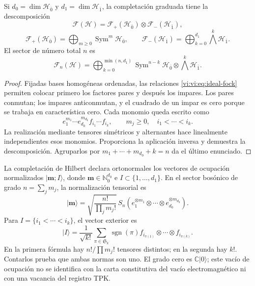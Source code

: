\begin{theorem}
\label{vi:vi:thm:fock-graduado}
Si \(d_0=\dim\mathcal H_{\bar0}\) y
\(d_1=\dim\mathcal H_{\bar1}\), la completación graduada tiene
la descomposición
\begin{equation}
 \mathcal F(\mathcal H)=
 \mathcal F_+(\mathcal H_{\bar0})\otimes
 \mathcal F_-(\mathcal H_{\bar1}),
 \label{vi:vi:eq:fock-producto}
\end{equation}
\[
 \mathcal F_+(\mathcal H_{\bar0})=
 \bigoplus_{m\ge0}\operatorname{Sym}^m\mathcal H_{\bar0},
 \qquad
 \mathcal F_-(\mathcal H_{\bar1})=
 \bigoplus_{k=0}^{d_1}\bigwedge^k\mathcal H_{\bar1}.
\]
El sector de número total \(n\) es
\[
 \mathcal F_n(\mathcal H)=
 \bigoplus_{k=0}^{\min(n,d_1)}
 \operatorname{Sym}^{n-k}\mathcal H_{\bar0}
 \otimes\bigwedge^k\mathcal H_{\bar1}.
\]
\end{theorem}
\begin{proof}
Fijadas bases homogéneas ordenadas, las relaciones
\eqref{vi:vi:eq:ideal-fock} permiten colocar primero los factores pares
y después los impares. Los pares conmutan; los impares anticonmutan,
y el cuadrado de un impar es cero porque se trabaja en característica
cero. Cada monomio queda escrito como
\[
 e_1^{m_1}\cdots e_{d_0}^{m_{d_0}}
 f_{i_1}\cdots f_{i_k},
 \qquad m_j\ge0,\quad i_1<\cdots<i_k.
\]
La realización mediante tensores simétricos y alternantes hace
linealmente independientes esos monomios. Proporciona la aplicación
inversa y demuestra la descomposición. Agruparlos por
\(m_1+\cdots+m_{d_0}+k=n\) da el último enunciado.
\end{proof}

La completación de Hilbert declara ortonormales los vectores de
ocupación normalizados \(|\boldsymbol m;I\rangle\), donde
\(\boldsymbol m\in\mathbb N_0^{d_0}\) e
\(I\subset\{1,\ldots,d_1\}\). En el sector bosónico de grado
\(n=\sum_jm_j\), la normalización tensorial es
\[
 |\boldsymbol m\rangle=
 \sqrt{\frac{n!}{\prod_jm_j!}}\,
 S_n(e_1^{\otimes m_1}\otimes\cdots\otimes
 e_{d_0}^{\otimes m_{d_0}}).
\]
Para \(I=\{i_1<\cdots<i_k\}\), el vector exterior es
\[
 |I\rangle=\frac1{\sqrt{k!}}\sum_{\pi\in\mathfrak S_k}
 \operatorname{sgn}(\pi)
 f_{i_{\pi(1)}}\otimes\cdots\otimes f_{i_{\pi(k)}}.
\]
En la primera fórmula hay \(n!/\prod m_j!\) tensores distintos;
en la segunda hay \(k!\). Contarlos prueba que ambas normas son uno.
El grado cero es \(\mathbb C|0\rangle\); este vacío de ocupación
no se identifica con la carta constitutiva del vacío electromagnético
ni con una vacancia del registro TPK.

